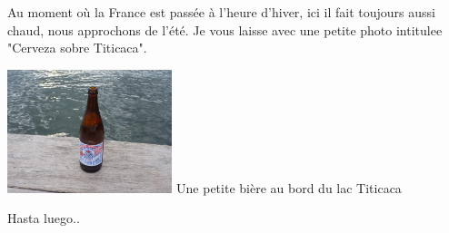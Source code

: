 \begin{multicols}{2}
Au moment où la France est passée à l'heure d'hiver, ici il fait toujours aussi chaud, nous approchons de l'été. Je vous laisse avec une petite photo intitulee "Cerveza sobre Titicaca".

\hspace*{-0.65cm}
\includegraphics[width=4.8cm]{articles/Arequipa-colca-titicaca/1256606978ASqj.jpg}
Une petite bière au bord du lac Titicaca

Hasta luego..

\end{multicols}
